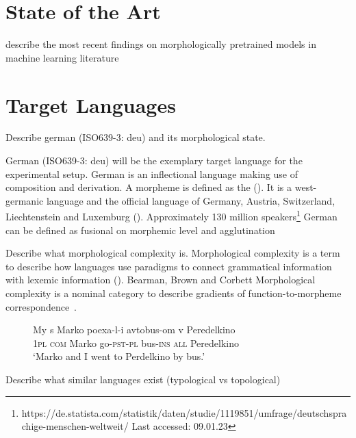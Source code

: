 \section{State of the Art}
\label{sec:state-of-the-art}
describe the most recent findings on morphologically pretrained models in machine learning literature

\section{Target Languages}
\label{sec:target-languages}
Describe german (ISO639-3: deu) and its morphological state.

German (ISO639-3: deu) will be the exemplary target language for the experimental setup.
German is an inflectional language making use of composition and derivation.
A morpheme is defined as the  (\cite{morpheme}).
It is a west-germanic language and the official language of Germany, Austria, Switzerland, Liechtenstein and Luxemburg (\cite{METZLER2016}).
Approximately 130 million speakers\footnote{https://de.statista.com/statistik/daten/studie/1119851/umfrage/deutschsprachige-menschen-weltweit/ Last accessed: 09.01.23}
German can be defined as fusional on morphemic level and agglutination


Describe what morphological complexity is.
Morphological complexity is a term to describe how languages use paradigms to connect grammatical information with lexemic information (\cite{MORPHOLOGICALCOMPLEXITY}).
Bearman, Brown and Corbett
Morphological complexity is a nominal category to describe gradients of function-to-morpheme correspondence~\cite{ATTENTION}.

\begin{figure}
    \label{fig:glossing}
\begin{exe}
\ex
\gll  My s Marko poexa-l-i avtobus-om v Peredelkino \\
1\textsc{pl} \textsc{com} Marko go-\textsc{pst}-\textsc{pl} bus-\textsc{ins} \textsc{all} Peredelkino \\
\glt  `Marko and I went to Perdelkino by bus.'
\end{exe}
\end{figure}



Describe what similar languages exist (typological vs topological)

